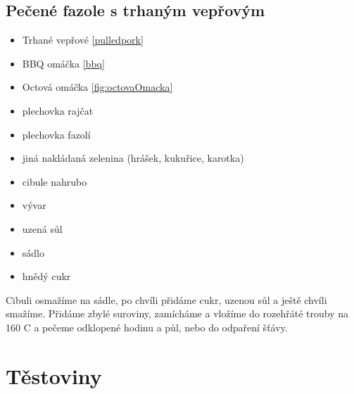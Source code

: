 \documentclass[10pt,a4paper]{article}
\newenvironment{myitemize}
{ \begin{itemize}
    \setlength{\itemsep}{0pt}
    \setlength{\parskip}{0pt}
    \setlength{\parsep}{0pt}     }
{ \end{itemize}                  }
\begin{document}
\subsection{Pečené fazole s trhaným vepřovým} 
\begin{minipage}[t]{0,5\textwidth}
\begin{myitemize} 
\item Trhané vepřové \ref{pulledpork}
\item BBQ omáčka \ref{bbq}
\item Octová omáčka \ref{fig:octovaOmacka}
\item plechovka rajčat
\item plechovka fazolí
\item jiná nakládaná zelenina (hrášek, kukuřice, karotka)
\item cibule nahrubo
\item vývar
\item uzená sůl
\item sádlo
\item hnědý cukr
\end{myitemize}
\end{minipage}
\begin{minipage}[t]{0,5\textwidth}
Cibuli osmažíme na sádle, po chvíli přidáme cukr, uzenou sůl a ještě chvíli smažíme. Přidáme zbylé suroviny, zamícháme a vložíme do rozehřáté trouby na 160 \degree C a pečeme odklopené hodinu a půl, nebo do odpaření šťávy.
\end{minipage}
\pagebreak
\section{Těstoviny}
\end{document}
